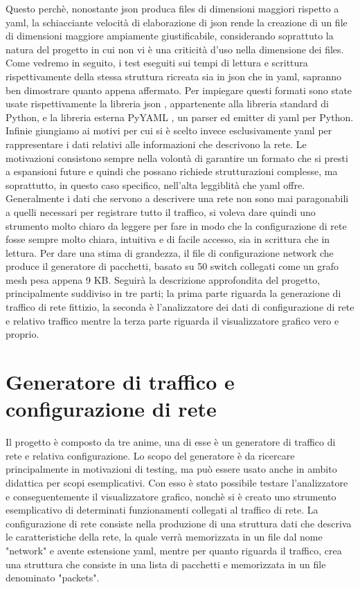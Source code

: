 \documentclass[binding=0.6cm]{sapthesis}
\begin{document}
Questo perchè, nonostante json produca files di dimensioni maggiori rispetto a yaml, la schiacciante velocità di elaborazione di json rende la creazione di
un file di dimensioni maggiore ampiamente giustificabile, considerando soprattuto la natura del progetto in cui non vi è una
criticità d'uso nella dimensione dei files. Come vedremo in seguito, i test eseguiti sui tempi di lettura e scrittura rispettivamente della stessa struttura
ricreata sia in json che in yaml, sapranno ben
dimostrare quanto appena affermato. Per impiegare questi formati sono state usate rispettivamente la libreria json \cite{PythonJSONLibrary}, appartenente alla libreria standard di Python, e la
libreria esterna PyYAML \cite{PyYAMLDocumentation}, un parser ed emitter di yaml per Python.
Infinie giungiamo ai motivi per cui si è scelto invece esclusivamente yaml per rappresentare i 
dati relativi alle informazioni che descrivono la rete. Le motivazioni consistono sempre nella volontà
di garantire un formato che si presti a espansioni future e quindi che possano richiede strutturazioni complesse, ma soprattutto,
in questo caso specifico, nell'alta leggiblità che yaml offre. Generalmente i dati che servono a descrivere una rete non sono mai paragonabili a quelli
necessari per registrare tutto il traffico, si voleva dare quindi uno strumento molto chiaro da leggere per fare in modo che la configurazione di rete
fosse sempre molto chiara, intuitiva e di facile accesso, sia in scrittura che in lettura. 
Per dare una stima di grandezza, il file
di configurazione network che produce il generatore di pacchetti, basato su 50 switch collegati come un grafo mesh pesa appena 9 KB.
Seguirà la descrizione approfondita del progetto, principalmente suddiviso in tre parti; la prima 
parte riguarda la generazione di traffico di rete fittizio, la seconda è l'analizzatore dei dati di configurazione di rete e relativo traffico mentre la terza
parte riguarda il visualizzatore grafico vero e proprio.

\chapter{Generatore di traffico e configurazione di rete}

Il progetto è composto da tre anime, una di esse è un generatore di traffico di rete e relativa configurazione.
Lo scopo del generatore è da ricercare principalmente in motivazioni di testing, ma può essere
 usato anche in ambito didattica per scopi
esemplicativi. Con esso è stato possibile testare l'analizzatore e conseguentemente il visualizzatore grafico, nonchè si è creato 
uno strumento esemplicativo di determinati funzionamenti collegati al traffico di rete.
La configurazione di rete consiste nella produzione di una struttura dati che descriva 
le caratteristiche della rete, la quale
verrà memorizzata in un file dal nome "network" e avente estensione yaml, mentre per quanto
riguarda il traffico, crea una struttura che consiste in una lista di pacchetti e memorizzata in un file denominato "packets".
\end{document}
